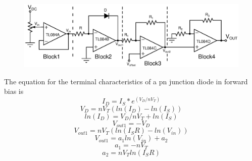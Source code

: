 \documentclass[12pt]{article}
\begin{document}
\begin{figure}[H]
\begin{center}
\includegraphics[scale = 0.8]{a.eps}
\end{center}
\end{figure}
The equation for the terminal characteristics of a pn junction diode in forward bias is
\begin{equation}
   I_D = I_S * e^{(V_D/nV_T)}
 \end{equation}
\begin{equation}
   V_D = nV_T  (ln(I_D) - ln(I_S)) 
 \end{equation}
\begin{equation}
  ln(I_D) = V_D/nV_T + ln(I_S)
 \end{equation}
\begin{equation}
  V_{out1} = -V_D
 \end{equation}
\begin{equation}
  V_{out1} = nV_T  (ln(I_SR) - ln(V_{in})) 
 \end{equation}
\begin{equation}
  V_{out1} = a_1 ln(V_{in}) + a_2 
 \end{equation}
\begin{equation}
 a_1 = -nV_T 
 \end{equation}
\begin{equation}
  a_2 = nV_T ln(I_SR) 
 \end{equation}
\end{document}

